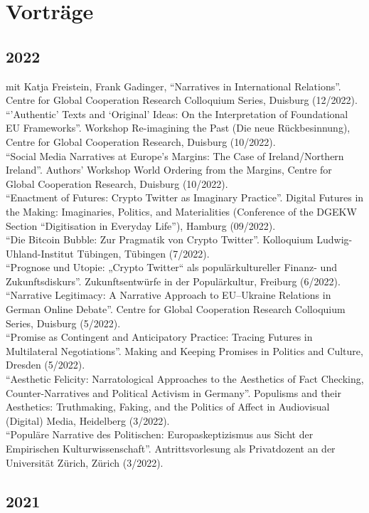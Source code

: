 \section*{Vorträge}
\subsection*{2022}
mit Katja Freistein, Frank Gadinger, \enquote{Narratives in International Relations}. Centre for Global Cooperation Research Colloquium Series, Duisburg (12/2022).\\[.25cm]\enquote{'Authentic’ Texts and ‘Original’ Ideas: On the Interpretation of Foundational EU Frameworks}. Workshop Re-imagining the Past (Die neue Rückbesinnung), Centre for Global Cooperation Research, Duisburg (10/2022).\\[.25cm]\enquote{Social Media Narratives at Europe’s Margins: The Case of Ireland/Northern Ireland}. Authors’ Workshop World Ordering from the Margins, Centre for Global Cooperation Research, Duisburg (10/2022).\\[.25cm]\enquote{Enactment of Futures: Crypto Twitter as Imaginary Practice}. Digital Futures in the Making: Imaginaries, Politics, and Materialities (Conference of the DGEKW Section “Digitisation in Everyday Life”), Hamburg (09/2022).\\[.25cm]\enquote{Die Bitcoin Bubble: Zur Pragmatik von Crypto Twitter}. Kolloquium Ludwig-Uhland-Institut Tübingen, Tübingen (7/2022).\\[.25cm]\enquote{Prognose und Utopie: „Crypto Twitter“ als populärkultureller Finanz- und Zukunftsdiskurs}. Zukunftsentwürfe in der Populärkultur, Freiburg (6/2022).\\[.25cm]\enquote{Narrative Legitimacy: A Narrative Approach to EU–Ukraine Relations in German Online Debate}. Centre for Global Cooperation Research Colloquium Series, Duisburg (5/2022).\\[.25cm]\enquote{Promise as Contingent and Anticipatory Practice: Tracing Futures in Multilateral Negotiations}. Making and Keeping Promises in Politics and Culture, Dresden (5/2022).\\[.25cm]\enquote{Aesthetic Felicity: Narratological Approaches to the Aesthetics of Fact Checking, Counter-Narratives and Political Activism in Germany}. Populisms and their Aesthetics: Truthmaking, Faking, and the Politics of Affect in Audiovisual (Digital) Media, Heidelberg (3/2022).\\[.25cm]\enquote{Populäre Narrative des Politischen: Europaskeptizismus aus Sicht der Empirischen Kulturwissenschaft}. Antrittsvorlesung als Privatdozent an der Universität Zürich, Zürich (3/2022).\subsection*{2021}
